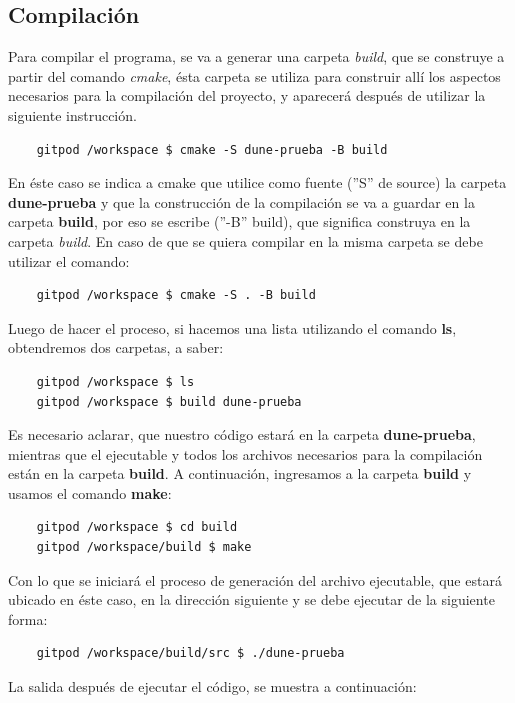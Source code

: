 \subsection{Compilación}
Para compilar el programa, se va a generar una carpeta \textit{build}, 
que se construye a partir del comando \textit{cmake}, ésta carpeta 
se utiliza para construir allí los aspectos necesarios para la compilación del proyecto, y aparecerá después 
de utilizar la siguiente instrucción.   
\begin{verbatim}
	gitpod /workspace $ cmake -S dune-prueba -B build
\end{verbatim}
En éste caso se indica a cmake que utilice como fuente (''S'' de source) la carpeta \textbf{dune-prueba} y 
que la construcción de la compilación se va a guardar en la carpeta \textbf{build}, por eso se escribe (''-B'' build),
que significa construya en la carpeta \textit{build}.
En caso de que se quiera compilar en la misma carpeta se debe utilizar el comando: 
\begin{verbatim}
	gitpod /workspace $ cmake -S . -B build
\end{verbatim}
Luego de hacer el proceso, si hacemos una lista utilizando el comando \textbf{ls}, obtendremos dos carpetas, a saber:
\begin{verbatim}
	gitpod /workspace $ ls
	gitpod /workspace $ build dune-prueba
\end{verbatim}
Es necesario aclarar, que nuestro código estará en la carpeta \textbf{dune-prueba}, mientras que el ejecutable y 
todos los archivos necesarios para la compilación están en la carpeta \textbf{build}.  A continuación, ingresamos 
a la carpeta \textbf{build} y usamos el comando \textbf{make}:
\begin{verbatim}
	gitpod /workspace $ cd build
	gitpod /workspace/build $ make
\end{verbatim}
Con lo que se iniciará el proceso de generación del archivo ejecutable, que estará ubicado en éste caso, en 
la dirección siguiente y se debe ejecutar de la siguiente forma:
\begin{verbatim}
	gitpod /workspace/build/src $ ./dune-prueba
\end{verbatim}
La salida después de ejecutar el código, se muestra a continuación:
\begin{listing}[ht!]
	\inputminted{bash}{dune-learn-1.txt}
\end{listing}

\immediate{}
